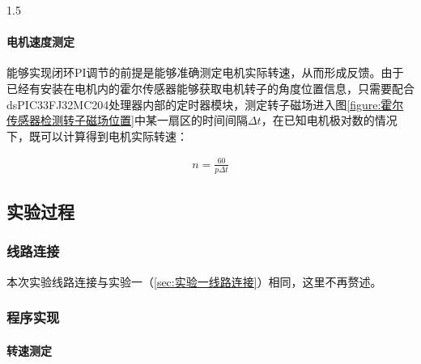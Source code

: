 \documentclass[a4paper,11pt]{ctexart}
\newcommand{\dsp}{dsPIC33FJ32MC204}
\newenvironment{shrinkeq}[2]
{
	\bgroup
	\addtolength\abovedisplayshortskip{#1}
	\addtolength\abovedisplayskip{#1}
	\addtolength\belowdisplayshortskip{#2}
	\addtolength\belowdisplayskip{#2}
}
{
	\egroup
	\ignorespacesafterend
}
\begin{document}
\begin{spacing}{1.5}
\paragraph{电机速度测定}
能够实现闭环PI调节的前提是能够准确测定电机实际转速，从而形成反馈。由于已经有安装在电机内的霍尔传感器能够获取电机转子的角度位置信息，只需要配合\dsp 处理器内部的定时器模块，测定转子磁场进入图\ref{figure:霍尔传感器检测转子磁场位置}中某一扇区的时间间隔$\Delta t$，在已知电机极对数的情况下，既可以计算得到电机实际转速：
\begin{shrinkeq}{-1.5ex}{-2.5ex}
	\begin{align}
	n = \frac{60}{p\Delta t}
	\end{align}
\end{shrinkeq}
\subsection{实验过程}
\subsubsection{线路连接}
\par
本次实验线路连接与实验一（\ref{sec:实验一线路连接}）相同，这里不再赘述。
\subsubsection{程序实现}
\paragraph{转速测定}

\end{spacing}


	
\end{document}
